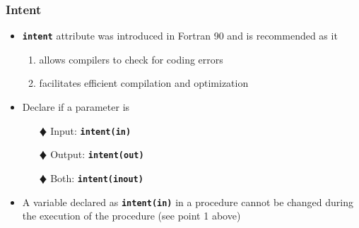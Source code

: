 \documentclass[slidestop,mathserif,compress,xcolor=svgnames]{beamer}
\newcommand{\bftt}[1]{\textbf{\texttt{#1}}}
\newenvironment{eblock}[0]
{
\begin{beamerboxesrounded}[upper=uppercol2,lower=lowercol2,shadow=true]}
{\end{beamerboxesrounded}}
\begin{document}
\begin{frame}[fragile]
  \frametitle{\small Intent}
  \begin{itemize}
    \item \textbf{\texttt{intent}} attribute was introduced in Fortran 90 and is recommended as it
    \begin{enumerate}
      \item allows compilers to check for coding errors
      \item facilitates efficient compilation and optimization
    \end{enumerate}
    \item Declare if a parameter is
    \begin{enumerate}
      \item[$\vardiamond$]Input: \bftt{intent(in)} 
      \item[$\vardiamond$]Output: \bftt{intent(out)}
      \item[$\vardiamond$]Both: \bftt{intent(inout)}
    \end{enumerate}
    \item A variable declared as \textbf{\texttt{intent(in)}} in a procedure cannot be changed during the execution of the procedure (see point 1 above)
  \end{itemize}
\end{frame}
\end{document}
